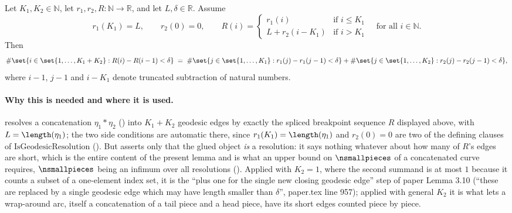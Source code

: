 \begin{lemma}
  Let $K_1,K_2 \in \mathbb{N}$, let $r_1,r_2,R \colon \mathbb{N} \to \mathbb{R}$, and let
  $L,\delta \in \mathbb{R}$. Assume
  \[
    r_1(K_1) = L, \qquad r_2(0) = 0, \qquad
    R(i) = \begin{cases} r_1(i) & \text{if } i \le K_1 \\ L + r_2(i-K_1) & \text{if } i > K_1
    \end{cases}
    \quad \text{for all } i \in \mathbb{N}
    .
  \]
  Then
  \[
    \#\set{i \in \set{1,\dots,K_1+K_2} : R(i)-R(i-1) < \delta}
    \;=\;
    \#\set{j \in \set{1,\dots,K_1} : r_1(j)-r_1(j-1) < \delta}
    + \#\set{j \in \set{1,\dots,K_2} : r_2(j)-r_2(j-1) < \delta}
    ,
  \]
  where $i-1$, $j-1$ and $i-K_1$ denote truncated subtraction of natural numbers.

  \paragraph{Why this is needed and where it is used.}
   resolves a concatenation $\eta_1 * \eta_2$
  () into $K_1+K_2$ geodesic edges by exactly the spliced breakpoint sequence
  $R$ displayed above, with $L = \length(\eta_1)$; the two side conditions are automatic there,
  since $r_1(K_1) = \length(\eta_1)$ and $r_2(0)=0$ are two of the defining clauses of
  $\mathrm{IsGeodesicResolution}$ (). But
   asserts only that the glued object \emph{is} a resolution: it
  says nothing whatever about how many of $R$'s edges are short, which is the entire content of the
  present lemma and is what an upper bound on $\nsmallpieces$ of a concatenated curve requires,
  $\nsmallpieces$ being an infimum over all resolutions (). Applied with
  $K_2=1$, where the second summand is at most $1$ because it counts a subset of a one-element
  index set, it is the ``plus one for the single new closing geodesic edge'' step of paper Lemma
  3.10 (``these are replaced by a single geodesic edge which may have length smaller than $\delta$'',
  paper.tex line 957); applied with general $K_2$ it is what lets a wrap-around arc, itself a
  concatenation of a tail piece and a head piece, have its short edges counted piece by piece.
\end{lemma}
